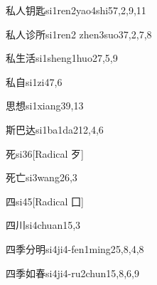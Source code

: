 \begin{verbete}{私人钥匙}{si1ren2yao4shi5}{7,2,9,11}
\end{verbete}

\begin{verbete}{私人诊所}{si1ren2 zhen3suo3}{7,2,7,8}
\end{verbete}

\begin{verbete}{私生活}{si1sheng1huo2}{7,5,9}
\end{verbete}

\begin{verbete}{私自}{si1zi4}{7,6}
\end{verbete}

\begin{verbete}{思想}{si1xiang3}{9,13}
\end{verbete}

\begin{verbete}{斯巴达}{si1ba1da2}{12,4,6}
\end{verbete}

\begin{verbete}{死}{si3}{6}[Radical 歹]
\end{verbete}

\begin{verbete}{死亡}{si3wang2}{6,3}
\end{verbete}

\begin{verbete}{四}{si4}{5}[Radical 囗]
\end{verbete}

\begin{verbete}{四川}{si4chuan1}{5,3}
\end{verbete}

\begin{verbete}{四季分明}{si4ji4-fen1ming2}{5,8,4,8}
\end{verbete}

\begin{verbete}{四季如春}{si4ji4-ru2chun1}{5,8,6,9}
\end{verbete}

